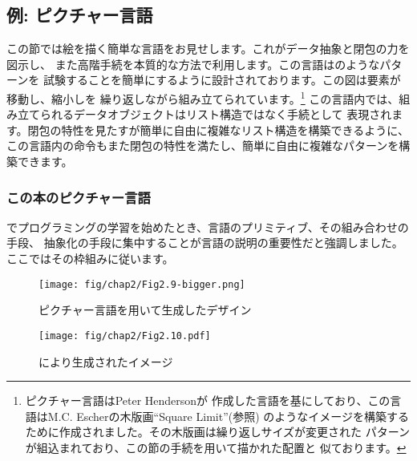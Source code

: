 \subsection{例: ピクチャー言語}
\label{Section 2.2.4}


この節では絵を描く簡単な言語をお見せします。これがデータ抽象と閉包の力を図示し、
また高階手続を本質的な方法で利用します。この言語はのようなパターンを
試験することを簡単にするように設計されております。この図は要素が移動し、縮小しを
繰り返しながら組み立てられています。\footnote{ピクチャー言語はPeter Hendersonが
作成した言語を基にしており、この言語はM.C. Escherの木版画``Square Limit''(参照)
のようなイメージを構築するために作成されました。その木版画は繰り返しサイズが変更された
パターンが組込まれており、この節の手続を用いて描かれた配置と
似ております。}
この言語内では、組み立てられるデータオブジェクトはリスト構造ではなく手続として
表現されます。閉包の特性を見たすが簡単に自由に複雑なリスト構造を構築できるように、
この言語内の命令もまた閉包の特性を満たし、簡単に自由に複雑なパターンを構築できます。

\subsubsection*{この本のピクチャー言語}



でプログラミングの学習を始めたとき、言語のプリミティブ、その組み合わせの手段、
抽象化の手段に集中することが言語の説明の重要性だと強調しました。
ここではその枠組みに従います。

\begin{figure}[tb]
\label{Figure 2.9}
\centering
\begin{comment}
\heading{Figure 2.9:} Designs generated with the picture language.

[two graphic images not included]
\end{comment}
\texttt{[image: fig/chap2/Fig2.9-bigger.png]}
\par\bigskip
\noindent
{} ピクチャー言語を用いて生成したデザイン
\end{figure}

\begin{figure}[tb]
\label{Figure 2.10}
\centering
\begin{comment}
\heading{Figure 2.10:} Images produced by the \code{wave}
painter, with respect to four different frames.  The frames, shown with dotted
lines, are not part of the images.

[four graphic images not included]
\end{comment}
\texttt{[image: fig/chap2/Fig2.10.pdf]}
\par\bigskip
\noindent
{} により生成されたイメージ
\end{figure}

